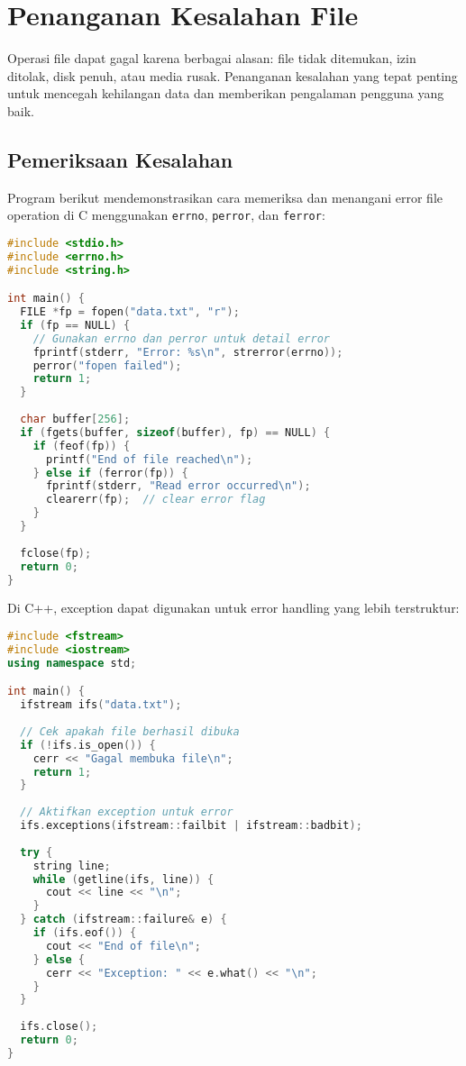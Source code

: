 \documentclass[../main.tex]{subfiles}
\begin{document}
\section{Penanganan Kesalahan File}

Operasi file dapat gagal karena berbagai alasan: file tidak ditemukan, izin ditolak, disk penuh, atau media rusak. Penanganan kesalahan yang tepat penting untuk mencegah kehilangan data dan memberikan pengalaman pengguna yang baik.

\subsection{Pemeriksaan Kesalahan}

Program berikut mendemonstrasikan cara memeriksa dan menangani error file operation di C menggunakan \texttt{errno}, \texttt{perror}, dan \texttt{ferror}:

\begin{lstlisting}[language=C, caption={Penanganan kesalahan di C}]
#include <stdio.h>
#include <errno.h>
#include <string.h>

int main() {
  FILE *fp = fopen("data.txt", "r");
  if (fp == NULL) {
    // Gunakan errno dan perror untuk detail error
    fprintf(stderr, "Error: %s\n", strerror(errno));
    perror("fopen failed");
    return 1;
  }
  
  char buffer[256];
  if (fgets(buffer, sizeof(buffer), fp) == NULL) {
    if (feof(fp)) {
      printf("End of file reached\n");
    } else if (ferror(fp)) {
      fprintf(stderr, "Read error occurred\n");
      clearerr(fp);  // clear error flag
    }
  }
  
  fclose(fp);
  return 0;
}
\end{lstlisting}

Di C++, exception dapat digunakan untuk error handling yang lebih terstruktur:

\begin{lstlisting}[language=C++, caption={Penanganan kesalahan di C++}]
#include <fstream>
#include <iostream>
using namespace std;

int main() {
  ifstream ifs("data.txt");
  
  // Cek apakah file berhasil dibuka
  if (!ifs.is_open()) {
    cerr << "Gagal membuka file\n";
    return 1;
  }
  
  // Aktifkan exception untuk error
  ifs.exceptions(ifstream::failbit | ifstream::badbit);
  
  try {
    string line;
    while (getline(ifs, line)) {
      cout << line << "\n";
    }
  } catch (ifstream::failure& e) {
    if (ifs.eof()) {
      cout << "End of file\n";
    } else {
      cerr << "Exception: " << e.what() << "\n";
    }
  }
  
  ifs.close();
  return 0;
}
\end{lstlisting}
\end{document}
